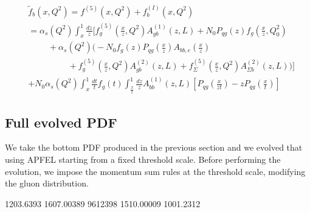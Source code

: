\documentclass[10pt,a4paper]{article}
\begin{document}
\begin{equation}
\begin{split}
&\tilde{f}_b\left(x,Q^2\right) = f^{\left(5\right)}\left(x,Q^2\right) + f_b^{\left(I\right)}\left(x,Q^2\right)  \\
&=\alpha_s\left(Q^2\right)\int_x^1\frac{dz}{z}\bigg[f_{g}^{\left(5\right)}\left(\frac{x}{z},Q^2\right) A_{g b}^{\left(1\right)}\left(z,L\right) +  N_0 P_{qg}\left(z\right)f_g\left(\frac{x}{z},Q_0^2\right) \\
&\,\,\,\,\,\,\,\,\,\,\,\,\,\,+ \alpha_s\left(Q^2\right)\bigg(-N_0 f_g\left(z\right)P_{qg}\left(\frac{x}{z}\right)A_{bb,e}\left(\frac{x}{z}\right)\\ & \,\,\,\,\,\,\,\,\,\,\,\,\,\,\,\,\,\,\,\,\,\,\,\,\,\,\,\,+f_g^{\left(5\right)}\left(\frac{x}{z},Q^2\right)A_{g b}^{\left(2\right)}\left(z,L\right)+f_{\Sigma}^{\left(5\right)}\left(\frac{x}{z},Q^2\right) A_{\Sigma b}^{\left(2\right)}\left(z,L\right) \bigg)\bigg] \\
&+ N_0 \alpha_s\left(Q^2\right)\int_x^1 \frac{dt}{t} f_g\left(t\right) \int_{\frac{x}{t}}^{1}\frac{dz}{z}A_{bb}^{\left(1\right)}\left(z,L\right)\left[P_{qg}\left(\frac{x}{zt}\right) - z P_{qg}\left(\frac{x}{t}\right)\right]
\end{split}
\end{equation}

\subsection*{Full evolved PDF}
We take the bottom PDF produced in the previous section and we evolved that using APFEL starting from a fixed threshold scale. Before performing the evolution, we impose the momentum sum rules at the threshold scale, modifying the gluon distribution.



\begin{thebibliography}{9}
	 1203.6393 
	 1607.00389
	 9612398
	 1510.00009
	 1001.2312
\end{thebibliography}
\end{document}
